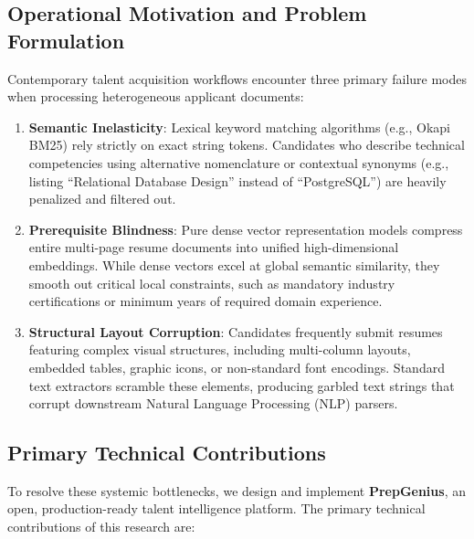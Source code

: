 \documentclass[conference]{IEEEtran}
\begin{document}
\subsection{Operational Motivation and Problem Formulation}
Contemporary talent acquisition workflows encounter three primary failure modes when processing heterogeneous applicant documents:

\begin{enumerate}
    \item \textbf{Semantic Inelasticity}: Lexical keyword matching algorithms (e.g., Okapi BM25) rely strictly on exact string tokens. Candidates who describe technical competencies using alternative nomenclature or contextual synonyms (e.g., listing ``Relational Database Design'' instead of ``PostgreSQL'') are heavily penalized and filtered out.
    \item \textbf{Prerequisite Blindness}: Pure dense vector representation models compress entire multi-page resume documents into unified high-dimensional embeddings. While dense vectors excel at global semantic similarity, they smooth out critical local constraints, such as mandatory industry certifications or minimum years of required domain experience.
    \item \textbf{Structural Layout Corruption}: Candidates frequently submit resumes featuring complex visual structures, including multi-column layouts, embedded tables, graphic icons, or non-standard font encodings. Standard text extractors scramble these elements, producing garbled text strings that corrupt downstream Natural Language Processing (NLP) parsers.
\end{enumerate}

\subsection{Primary Technical Contributions}
To resolve these systemic bottlenecks, we design and implement \textbf{PrepGenius}, an open, production-ready talent intelligence platform. The primary technical contributions of this research are:
\end{document}
